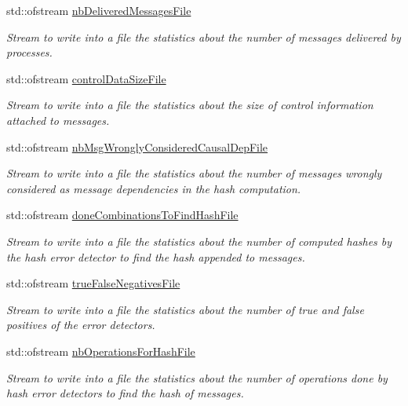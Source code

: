 \begin{DoxyCompactItemize}
std\+::ofstream \hyperlink{class_stats_acf354d2603af85eff78594ca27e4f189}{nb\+Delivered\+Messages\+File}
\begin{DoxyCompactList}\small\item\em Stream to write into a file the statistics about the number of messages delivered by processes. \end{DoxyCompactList}\item 
std\+::ofstream \hyperlink{class_stats_ac31328205361c1581099a3ed67d5ca1a}{control\+Data\+Size\+File}
\begin{DoxyCompactList}\small\item\em Stream to write into a file the statistics about the size of control information attached to messages. \end{DoxyCompactList}\item 
std\+::ofstream \hyperlink{class_stats_a3083f3da94481b94aaa8f53742834b97}{nb\+Msg\+Wrongly\+Considered\+Causal\+Dep\+File}
\begin{DoxyCompactList}\small\item\em Stream to write into a file the statistics about the number of messages wrongly considered as message dependencies in the hash computation. \end{DoxyCompactList}\item 
std\+::ofstream \hyperlink{class_stats_a3043ea15c3972ce785b42107fd9c1f5e}{done\+Combinations\+To\+Find\+Hash\+File}
\begin{DoxyCompactList}\small\item\em Stream to write into a file the statistics about the number of computed hashes by the hash error detector to find the hash appended to messages. \end{DoxyCompactList}\item 
std\+::ofstream \hyperlink{class_stats_ac9e180c84874fabd361396f3c9a166ae}{true\+False\+Negatives\+File}
\begin{DoxyCompactList}\small\item\em Stream to write into a file the statistics about the number of true and false positives of the error detectors. \end{DoxyCompactList}\item 
std\+::ofstream \hyperlink{class_stats_a80fd6543223c0e25e2dbab085b1822f6}{nb\+Operations\+For\+Hash\+File}
\begin{DoxyCompactList}\small\item\em Stream to write into a file the statistics about the number of operations done by hash error detectors to find the hash of messages. \end{DoxyCompactList}\item 

\end{DoxyCompactItemize}
